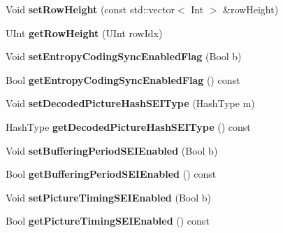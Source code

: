 \begin{DoxyCompactItemize}
\item 
\mbox{\label{class_t_enc_cfg_a2685569fdbe75d8dc06477055abf4ed1}} 
Void {\bfseries set\+Row\+Height} (const std\+::vector$<$ Int $>$ \&row\+Height)
\item 
\mbox{\label{class_t_enc_cfg_a984ab25eb6e7f19ca5ccaef6d72ac01c}} 
U\+Int {\bfseries get\+Row\+Height} (U\+Int row\+Idx)
\item 
\mbox{\label{class_t_enc_cfg_a2e9bb10e4ee5a829ba39098893a5ed56}} 
Void {\bfseries set\+Entropy\+Coding\+Sync\+Enabled\+Flag} (Bool b)
\item 
\mbox{\label{class_t_enc_cfg_a0c3f49ae1d19a4b719b11457804b9764}} 
Bool {\bfseries get\+Entropy\+Coding\+Sync\+Enabled\+Flag} () const
\item 
\mbox{\label{class_t_enc_cfg_a89dd165faaf8da3a707b88474c4576e2}} 
Void {\bfseries set\+Decoded\+Picture\+Hash\+S\+E\+I\+Type} (Hash\+Type m)
\item 
\mbox{\label{class_t_enc_cfg_a704668a67dbfa60efc51be337271a81d}} 
Hash\+Type {\bfseries get\+Decoded\+Picture\+Hash\+S\+E\+I\+Type} () const
\item 
\mbox{\label{class_t_enc_cfg_a258fb219e2951c0dc77f76573363d8e6}} 
Void {\bfseries set\+Buffering\+Period\+S\+E\+I\+Enabled} (Bool b)
\item 
\mbox{\label{class_t_enc_cfg_af055bc5b585f28ee55cdfa80bd0b6cc2}} 
Bool {\bfseries get\+Buffering\+Period\+S\+E\+I\+Enabled} () const
\item 
\mbox{\label{class_t_enc_cfg_a35af64f5c57d4f87fea2f2bba4e06d23}} 
Void {\bfseries set\+Picture\+Timing\+S\+E\+I\+Enabled} (Bool b)
\item 
\mbox{\label{class_t_enc_cfg_ae98ef2ebc000a2eeaf16060f87887734}} 
Bool {\bfseries get\+Picture\+Timing\+S\+E\+I\+Enabled} () const
\item 
\mbox{\label{class_t_enc_cfg_ab8ce4372b25d9345e8146d4464da026d}} 

\end{DoxyCompactItemize}
